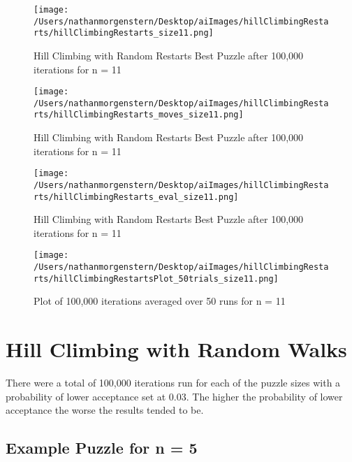 \documentclass{report}
\begin{document}
	\begin{figure}[H]
	\centering
	\texttt{[image: /Users/nathanmorgenstern/Desktop/aiImages/hillClimbingRestarts/hillClimbingRestarts\_size11.png]}
	\caption{Hill Climbing with Random Restarts Best Puzzle after 100,000 iterations for n = 11} 
	\label{fig: Hill Climbing with Random Restarts Best Puzzle after 100,000 iterations for n = 11}
	\end{figure}
	
	\begin{figure}[H]
	\centering
	\texttt{[image: /Users/nathanmorgenstern/Desktop/aiImages/hillClimbingRestarts/hillClimbingRestarts\_moves\_size11.png]}
	\caption{Hill Climbing with Random Restarts Best Puzzle after 100,000 iterations for n = 11} 
	\label{fig: Hill Climbing with Random Restarts Best Puzzle after 100,000 iterations for n = 11}
	\end{figure}

	\begin{figure}[H]
	\centering
	\texttt{[image: /Users/nathanmorgenstern/Desktop/aiImages/hillClimbingRestarts/hillClimbingRestarts\_eval\_size11.png]}
	\caption{Hill Climbing with Random Restarts Best Puzzle after 100,000 iterations for n = 11} 
	\label{fig: Hill Climbing with Random Restarts Best Puzzle after 100,000 iterations for n = 11}
	\end{figure}

	\begin{figure}[H]
	\centering
	\texttt{[image: /Users/nathanmorgenstern/Desktop/aiImages/hillClimbingRestarts/hillClimbingRestartsPlot\_50trials\_size11.png]}
	\caption{Plot of 100,000 iterations averaged over 50 runs for n = 11}
	\label{fig: Plot of 100,000 iterations averaged over 50 runs for n = 11}
	\end{figure}

\newpage
\section{Hill Climbing with Random Walks}
There were a total of 100,000 iterations run for each of the puzzle sizes with a probability of lower acceptance set at 0.03. The higher the probability of lower acceptance the worse the results tended to be.

\subsection{Example Puzzle for n = 5}
\end{document}
